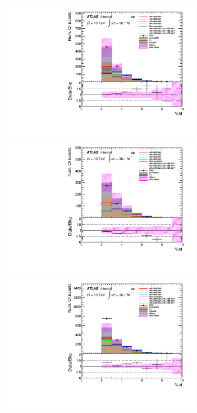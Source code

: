 \begin{figure}[h]
\begin{minipage}[t]{0.33\linewidth}
\centering
\includegraphics[width=0.9\textwidth,angle=-90]{fig/dataMC_low_Njet_CR/numOfjet_ee.pdf}
\end{minipage}
\begin{minipage}[t]{0.33\linewidth}
\centering
\includegraphics[width=0.9\textwidth,angle=-90]{fig/dataMC_low_Njet_CR/numOfjet_mumu.pdf}
\end{minipage}
\begin{minipage}[t]{0.33\linewidth}
\centering
\includegraphics[width=0.9\textwidth,angle=-90]{fig/dataMC_low_Njet_CR/numOfjet_emu.pdf}

\end{minipage}
\end{figure}
